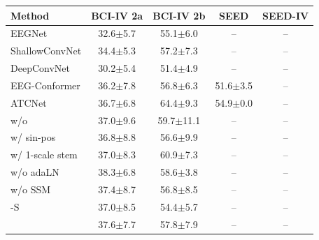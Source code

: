 \begin{tabular}{lcccc}
\toprule
Method & BCI-IV 2a & BCI-IV 2b & SEED & SEED-IV \\
\midrule
EEGNet & 32.6$\pm$5.7 & 55.1$\pm$6.0 & -- & -- \\
ShallowConvNet & 34.4$\pm$5.3 & 57.2$\pm$7.3 & -- & -- \\
DeepConvNet & 30.2$\pm$5.4 & 51.4$\pm$4.9 & -- & -- \\
EEG-Conformer & 36.2$\pm$7.8 & 56.8$\pm$6.3 & 51.6$\pm$3.5 & -- \\
ATCNet & 36.7$\pm$6.8 & 64.4$\pm$9.3 & 54.9$\pm$0.0 & -- \\
\method{} w/o \scn{} & 37.0$\pm$9.6 & 59.7$\pm$11.1 & -- & -- \\
\method{} w/ sin-pos & 36.8$\pm$8.8 & 56.6$\pm$9.9 & -- & -- \\
\method{} w/ 1-scale stem & 37.0$\pm$8.3 & 60.9$\pm$7.3 & -- & -- \\
\method{} w/o adaLN & 38.3$\pm$6.8 & 58.6$\pm$3.8 & -- & -- \\
\method{} w/o SSM & 37.4$\pm$8.7 & 56.8$\pm$8.5 & -- & -- \\
\method{}-S & 37.0$\pm$8.5 & 54.4$\pm$5.7 & -- & -- \\
\method{} & 37.6$\pm$7.7 & 57.8$\pm$7.9 & -- & -- \\
\bottomrule
\end{tabular}
